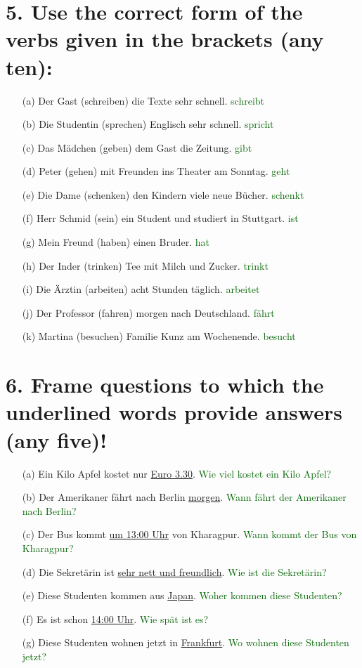 \documentclass{article}
\begin{document}
\section*{5. Use the correct form of the verbs given in the brackets (any ten):}
\begin{enumerate}
    \item[(a)] Der Gast (schreiben) die Texte sehr schnell. \textcolor{darkgreen}{schreibt}
    \item[(b)] Die Studentin (sprechen) Englisch sehr schnell. \textcolor{darkgreen}{spricht}
    \item[(c)] Das Mädchen (geben) dem Gast die Zeitung. \textcolor{darkgreen}{gibt}
    \item[(d)] Peter (gehen) mit Freunden ins Theater am Sonntag. \textcolor{darkgreen}{geht}
    \item[(e)] Die Dame (schenken) den Kindern viele neue Bücher. \textcolor{darkgreen}{schenkt}
    \item[(f)] Herr Schmid (sein) ein Student und studiert in Stuttgart. \textcolor{darkgreen}{ist}
    \item[(g)] Mein Freund (haben) einen Bruder. \textcolor{darkgreen}{hat}
    \item[(h)] Der Inder (trinken) Tee mit Milch und Zucker. \textcolor{darkgreen}{trinkt}
    \item[(i)] Die Ärztin (arbeiten) acht Stunden täglich. \textcolor{darkgreen}{arbeitet}
    \item[(j)] Der Professor (fahren) morgen nach Deutschland. \textcolor{darkgreen}{fährt}
    \item[(k)] Martina (besuchen) Familie Kunz am Wochenende. \textcolor{darkgreen}{besucht}
\end{enumerate}

\section*{6. Frame questions to which the underlined words provide answers (any five)!}
\begin{enumerate}
    \item[(a)] Ein Kilo Apfel kostet nur \underline{Euro 3.30}. \textcolor{darkgreen}{Wie viel kostet ein Kilo Apfel?}
    \item[(b)] Der Amerikaner fährt nach Berlin \underline{morgen}. \textcolor{darkgreen}{Wann fährt der Amerikaner nach Berlin?}
    \item[(c)] Der Bus kommt \underline{um 13:00 Uhr} von Kharagpur. \textcolor{darkgreen}{Wann kommt der Bus von Kharagpur?}
    \item[(d)] Die Sekretärin ist \underline{sehr nett und freundlich}. \textcolor{darkgreen}{Wie ist die Sekretärin?}
    \item[(e)] Diese Studenten kommen aus \underline{Japan}. \textcolor{darkgreen}{Woher kommen diese Studenten?}
    \item[(f)] Es ist schon \underline{14:00 Uhr}. \textcolor{darkgreen}{Wie spät ist es?}
    \item[(g)] Diese Studenten wohnen jetzt in \underline{Frankfurt}. \textcolor{darkgreen}{Wo wohnen diese Studenten jetzt?}
\end{enumerate}
\end{document}

